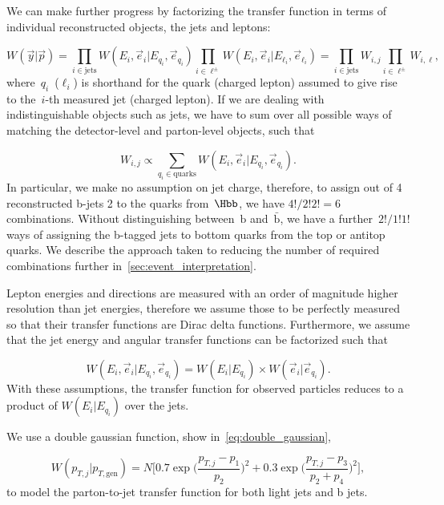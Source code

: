 We can make further progress by factorizing the transfer function in terms of individual reconstructed objects, the jets and leptons:

\begin{equation}
W(\vec{y} | \vec{p}) = \prod_{i\in \mathrm{jets}} W(E_i, \vec{e}_i | E_{q_i}, \vec{e}_{q_i})
\prod_{i\in \ell^\pm} W(E_i, \vec{e}_i | E_{\ell_i}, \vec{e}_{\ell_i}) = \prod_{i \in \mathrm{jets}} W_{i,j} \prod_{i \in \ell^\pm} W_{i,\ell},
\end{equation}
where~$q_i$~($\ell_i$) is shorthand for the quark (charged lepton) assumed to give rise to the~$i$-th measured jet (charged lepton). If we are dealing with indistinguishable objects such as jets, we have to sum over all possible ways of matching the detector-level and parton-level objects, such that

\begin{equation}
\label{eq:tf_combination_sum}
W_{i,j} \propto \sum_{q_i \in \mathrm{quarks}} W(E_i, \vec{e}_i | E_{q_i}, \vec{e}_{q_i}).
\end{equation}
In particular, we make no assumption on jet charge, therefore, to assign out of 4 reconstructed b-jets 2 to the quarks from~$\Hbb$, we have $4!/2!2! = 6$ combinations. Without distinguishing between~$\mathrm{b}$ and~$\bar{\mathrm{b}}$, we have a further~$2!/1!1!$ ways of assigning the b-tagged jets to bottom quarks from the top or antitop quarks. We describe the approach taken to reducing the number of required combinations further in~\cref{sec:event_interpretation}.

Lepton energies and directions are measured with an order of magnitude higher resolution than jet energies, therefore we assume those to be perfectly measured so that their transfer functions are Dirac delta functions.
Furthermore, we assume that the jet energy and angular transfer functions can be factorized such that

\begin{equation}
W(E_i, \vec{e}_i | E_{q_i}, \vec{e}_{q_i}) = W(E_i | E_{q_i}) \times W(\vec{e}_i | \vec{e}_{q_i}).
\end{equation}
With these assumptions, the transfer function for observed particles reduces to a product of $W(E_i | E_{q_i})$ over the jets.

We use a double gaussian function, show in~\cref{eq:double_gaussian},

\begin{equation}
\label{eq:double_gaussian}
W(p_{T,j} | p_{T,\mathrm{gen}}) = N \biggl[0.7\exp{\biggl(\frac{p_{T,j} - p_1}{p_2}\biggr)^2} + 0.3\exp{\biggl(\frac{p_{T,j} - p_3}{p_2+p_4}\biggr)^2}\biggr],
\end{equation}
to model the parton-to-jet transfer function for both light jets and b jets.

